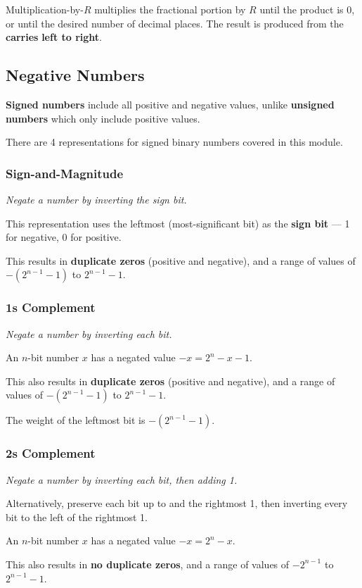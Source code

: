Multiplication-by-$R$ multiplies the fractional portion by $R$ until the product is 0, or until the desired number of decimal places.
The result is produced from the \textbf{carries} \textbf{left to right}.

\subsection{Negative Numbers}
\textbf{Signed numbers} include all positive and negative values, unlike \textbf{unsigned numbers} which
only include positive values.

There are 4 representations for signed binary numbers covered in this module.

\subsubsection{Sign-and-Magnitude}
\emph{Negate a number by inverting the sign bit.}

This representation uses the leftmost (most-significant bit) as the \textbf{sign bit} --- 1 for negative, 0 for positive.

This results in \textbf{duplicate zeros} (positive and negative), and a range of values of $-\left(2^{n-1} - 1\right)$ to $2^{n-1}-1$.

\subsubsection{1s Complement}
\emph{Negate a number by inverting each bit.}

An $n$-bit number $x$ has a negated value $-x = 2^n - x - 1$.

This also results in \textbf{duplicate zeros} (positive and negative), and a range of values of $-\left(2^{n-1} - 1\right)$ to $2^{n-1}-1$.


The weight of the leftmost bit is $-\left(2^{n-1} - 1\right)$.

\subsubsection{2s Complement}
\emph{Negate a number by inverting each bit, then adding 1.}

Alternatively, preserve each bit up to and the rightmost 1,
then inverting every bit to the left of the rightmost 1.

An $n$-bit number $x$ has a negated value $-x = 2^n - x$.

This also results in \textbf{no duplicate zeros}, and a range of values of $-2^{n-1}$ to $2^{n-1}-1$.

